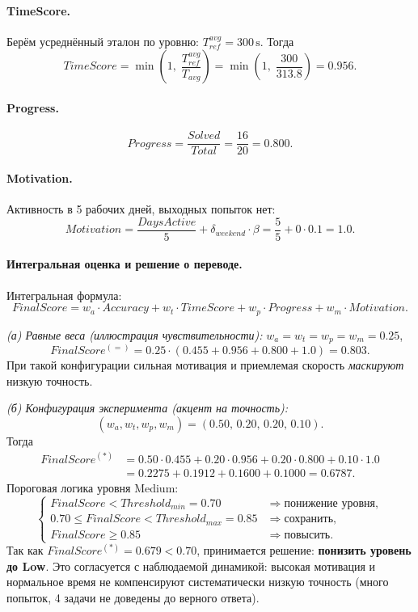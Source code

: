 \documentclass[12pt,a4paper]{article}
\begin{document}
\paragraph{TimeScore.}
Берём усреднённый эталон по уровню: $T^{avg}_{ref}=300\,\text{s}$. Тогда
\[
TimeScore=\min\!\left(1,\;\frac{T^{avg}_{ref}}{T_{avg}}\right)
= \min\!\left(1,\;\frac{300}{313.8}\right) = 0.956.
\]

\paragraph{Progress.}
\[
Progress=\frac{Solved}{Total}=\frac{16}{20}=0.800.
\]

\paragraph{Motivation.}
Активность в 5 рабочих дней, выходных попыток нет:
\[
Motivation=\frac{DaysActive}{5}+\delta_{weekend}\cdot\beta
= \frac{5}{5} + 0\cdot0.1 = 1.0.
\]

\paragraph{Интегральная оценка и решение о переводе.}
Интегральная формула:
\[
FinalScore = w_a\cdot Accuracy + w_t\cdot TimeScore + w_p\cdot Progress + w_m\cdot Motivation.
\]

\textit{(а) Равные веса (иллюстрация чувствительности):} 
$w_a=w_t=w_p=w_m=0.25$,
\[
FinalScore^{(=)} = 0.25\cdot(0.455+0.956+0.800+1.0) = 0.803.
\]
При такой конфигурации сильная мотивация и приемлемая скорость \emph{маскируют} низкую точность.

\textit{(б) Конфигурация эксперимента (акцент на точность):} 
\[
(w_a,w_t,w_p,w_m)=(0.50,\,0.20,\,0.20,\,0.10).
\]
Тогда
\[
\begin{aligned}
FinalScore^{(\ast)} &=
0.50\cdot 0.455 + 0.20\cdot 0.956 + 0.20\cdot 0.800 + 0.10\cdot 1.0 \\
&= 0.2275 + 0.1912 + 0.1600 + 0.1000 = 0.6787.
\end{aligned}
\]
Пороговая логика уровня Medium:
\[
\begin{cases}
FinalScore < Threshold_{min}=0.70 & \Rightarrow \text{понижение уровня},\\
0.70 \le FinalScore < Threshold_{max}=0.85 & \Rightarrow \text{сохранить},\\
FinalScore \ge 0.85 & \Rightarrow \text{повысить}.
\end{cases}
\]
Так как $FinalScore^{(\ast)}=0.679<0.70$, принимается решение: \textbf{понизить уровень до Low}.
Это согласуется с наблюдаемой динамикой: высокая мотивация и нормальное время не компенсируют
систематически низкую точность (много попыток, 4 задачи не доведены до верного ответа).
\end{document}
